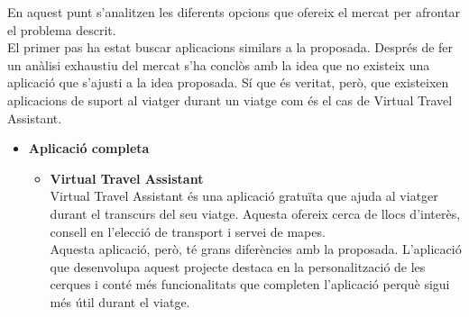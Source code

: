 En aquest punt s'analitzen les diferents opcions que ofereix el mercat per afrontar el problema descrit.\\
El primer pas ha estat buscar aplicacions similars a la proposada. Després de fer un anàlisi exhaustiu del mercat s'ha conclòs amb la idea que no existeix una aplicació que s'ajusti a la idea proposada. Sí que és veritat, però, que existeixen aplicacions de suport al viatger durant un viatge com és el cas de Virtual Travel Assistant.
\begin{itemize}
\item{\textbf{Aplicació completa}}
\begin{itemize}
\item{\textbf{Virtual Travel Assistant}}\\
Virtual Travel Assistant és una aplicació gratuïta que ajuda al viatger durant el transcurs del seu viatge. Aquesta ofereix cerca de llocs d'interès, consell en l'elecció de transport i servei de mapes.\\
Aquesta aplicació, però, té grans diferències amb la proposada. L'aplicació que desenvolupa aquest projecte destaca en la personalització de les cerques i conté més funcionalitats que completen l'aplicació perquè sigui més útil durant el viatge.\\
\end{itemize}


\end{itemize}
